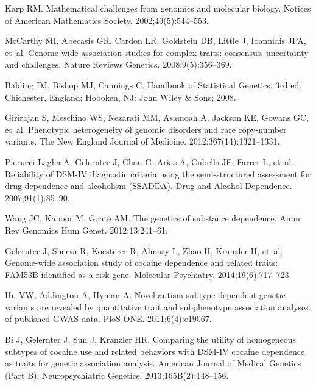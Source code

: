 \documentclass[10pt,letterpaper]{article}
\begin{document}
\begin{thebibliography}{10}

Karp RM.
\newblock Mathematical challenges from genomics and molecular biology.
\newblock Notices of American Mathematics Society. 2002;49(5):544--553.

McCarthy MI, Abecasis GR, Cardon LR, Goldstein DB, Little J, Ioannidis JPA,
  et~al.
\newblock Genome-wide association studies for complex traits: consensus,
  uncertainty and challenges.
\newblock Nature Reviews Genetics. 2008;9(5):356--369.

Balding DJ, Bishop MJ, Cannings C.
\newblock Handbook of Statistical Genetics.
\newblock 3rd ed. Chichester, England; Hoboken, NJ: John Wiley \& Sons; 2008.

Girirajan S, Meschino WS, Nezarati MM, Asamoah A, Jackson KE, Gowans GC, et~al.
\newblock Phenotypic heterogeneity of genomic disorders and rare copy-number
  variants.
\newblock The New England Journal of Medicine. 2012;367(14):1321--1331.

Pierucci-Lagha A, Gelernter J, Chan G, Arias A, Cubells JF, Farrer L, et~al.
\newblock Reliability of DSM-IV diagnostic criteria using the semi-structured
  assessment for drug dependence and alcoholism (SSADDA).
\newblock Drug and Alcohol Dependence. 2007;91(1):85--90.

Wang JC, Kapoor M, Goate AM.
\newblock The genetics of substance dependence.
\newblock Annu Rev Genomics Hum Genet. 2012;13:241--61.

Gelernter J, Sherva R, Koesterer R, Almasy L, Zhao H, Kranzler H, et~al.
\newblock Genome-wide association study of cocaine dependence and related
  traits: FAM53B identified as a risk gene.
\newblock Molecular Psychiatry. 2014;19(6):717--723.

Hu VW, Addington A, Hyman A.
\newblock Novel autism subtype-dependent genetic variants are revealed by
  quantitative trait and subphenotype association analyses of published GWAS
  data.
\newblock PloS {ONE}. 2011;6(4):e19067.

Bi J, Gelernter J, Sun J, Kranzler HR.
\newblock Comparing the utility of homogeneous subtypes of cocaine use and
  related behaviors with {DSM-IV} cocaine dependence as traits for genetic
  association analysis.
\newblock American Journal of Medical Genetics (Part B): Neuropsychiatric
  Genetics. 2013;165B(2):148--156.


\end{thebibliography}
\end{document}
